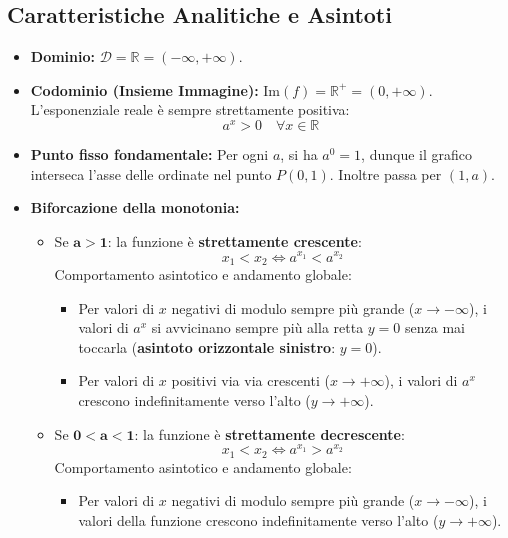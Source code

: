 \documentclass[11pt,a4paper,oneside]{report}
\begin{document}
\subsection{Caratteristiche Analitiche e Asintoti}
\begin{itemize}
    \item \textbf{Dominio:} $\mathcal{D} = \mathbb{R} = (-\infty, +\infty)$.
    \item \textbf{Codominio (Insieme Immagine):} $\mathrm{Im}(f) = \mathbb{R}^+ = (0, +\infty)$. L'esponenziale reale è sempre strettamente positiva:
    \begin{equation}
        a^x > 0 \quad \forall x \in \mathbb{R}
    \end{equation}
    \item \textbf{Punto fisso fondamentale:} Per ogni $a$, si ha $a^0 = 1$, dunque il grafico interseca l'asse delle ordinate nel punto $P(0, 1)$. Inoltre passa per $(1, a)$.
    \item \textbf{Biforcazione della monotonia:}
    \begin{itemize}
        \item Se $\mathbf{a > 1}$: la funzione è \textbf{strettamente crescente}:
        \begin{equation}
            x_1 < x_2 \iff a^{x_1} < a^{x_2}
        \end{equation}
        Comportamento asintotico e andamento globale:
        \begin{itemize}
            \item Per valori di $x$ negativi di modulo sempre più grande ($x \to -\infty$), i valori di $a^x$ si avvicinano sempre più alla retta $y = 0$ senza mai toccarla (\textbf{asintoto orizzontale sinistro}: $y = 0$).
            \item Per valori di $x$ positivi via via crescenti ($x \to +\infty$), i valori di $a^x$ crescono indefinitamente verso l'alto ($y \to +\infty$).
        \end{itemize}
        \item Se $\mathbf{0 < a < 1}$: la funzione è \textbf{strettamente decrescente}:
        \begin{equation}
            x_1 < x_2 \iff a^{x_1} > a^{x_2}
        \end{equation}
        Comportamento asintotico e andamento globale:
        \begin{itemize}
            \item Per valori di $x$ negativi di modulo sempre più grande ($x \to -\infty$), i valori della funzione crescono indefinitamente verso l'alto ($y \to +\infty$).

\end{itemize}
\end{itemize}
\end{itemize}
\end{document}
